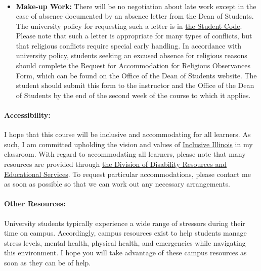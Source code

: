 \documentclass[11pt, a4paper]{article}
\begin{document}
\begin{itemize}
\begin{align*}
\end{align*}
\item[] \textbf{Make-up Work:} There will be no negotiation about late work 
        except in the case of absence documented by an absence letter from the 
                Dean of Students.  The university policy for requesting such a 
                letter is in 
                \href{http://studentcode.illinois.edu/article1_part5_1-501.html}{the 
                Student Code}. Please note that such a letter is appropriate 
                for many types of conflicts, but that religious conflicts 
                require special early handling. In accordance with university 
                policy, students seeking an excused absence for religious 
                reasons should complete the Request for Accommodation for 
                Religious Observances Form, which can be found on the Office of 
                the Dean of Students website. The student should submit this 
                form to the instructor and the Office of the Dean of Students 
                by the end of the second week of the course to which it 
                applies.

\end{itemize}

\paragraph{Accessibility:} I hope that this course will be inclusive and
accommodating for all learners. As such, I am committed upholding the vision
and values of \href{http://www.inclusiveillinois.illinois.edu/index.html}{Inclusive Illinois}
in my
classroom.  With regard to accommodating all learners, please note that many
resources are provided through
\href{http://disability.illinois.edu/academic-support/accommodations}{the
Division of Disability Resources and Educational Services}.  To request
particular accommodations, please contact me as soon as possible so that we can
work out any necessary arrangements.

\paragraph{Other Resources:}
University students typically experience a wide range of stressors during their
time on campus. Accordingly, campus resources exist to help students manage
stress levels, mental health, physical health, and emergencies while navigating
this environment. I hope you will take advantage of these campus resources as
soon as they can be of help.
\end{document}
